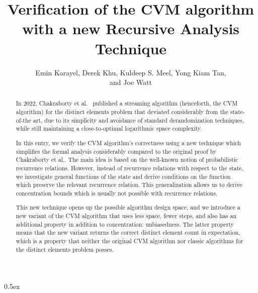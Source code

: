 \documentclass[11pt,a4paper]{article}
\begin{document}
\title{Verification of the CVM algorithm with a new Recursive Analysis Technique}
\author{Emin Karayel, Derek Khu, Kuldeep S. Meel, Yong Kiam Tan,\\and Joe Watt}
\maketitle

\begin{abstract}
In 2022, Chakraborty et al.~\cite{chakraborty2022} published a streaming
algorithm (henceforth, the CVM algorithm) for the distinct elements problem
that deviated considerably from the state-of-the art, due to its simplicity
and avoidance of standard derandomization techniques, while still maintaining
a close-to-optimal logarithmic space complexity.

In this entry, we verify the CVM algorithm's correctness using a new technique
which simplifies the formal analysis considerably compared to the original
proof by Chakraborty et al.. The main idea is based on the well-known notion of
probabilistic recurrence relations. However, instead of recurrence relations
with respect to the state, we investigate general functions of the state and
derive conditions on the function which preserve the relevant recurrence
relation. This generalization allows us to derive concentration bounds which is
usually not possible with recurrence relations.

This new technique opens up the possible algorithm design space, and we
introduce a new variant of the CVM algorithm that uses less space, fewer steps,
and also has an additional property in addition to concentration: unbiasedness.
The latter property means that the new variant returns the correct distinct
element count in expectation, which is a property that neither the original CVM
algorithm nor classic algorithms for the distinct elements problem posses.
\end{abstract}

\tableofcontents

\parindent 0pt\parskip 0.5ex





\end{document}
